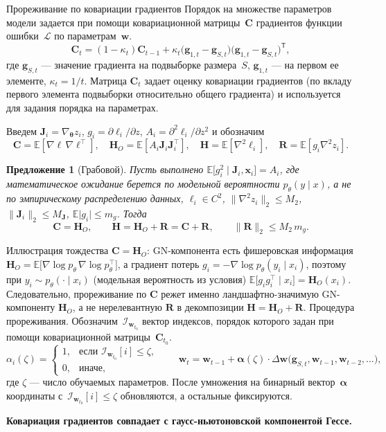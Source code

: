 \documentclass[9pt,pdf,hyperref={unicode}]{beamer}
\newtheorem{rusproposition}{Предложение}
\newcommand{\key}[1]{\par\vspace{0.5ex}\noindent\textbf{\color{darkgreen}#1}}
\begin{document}
\begin{frame}{Прореживание по ковариации градиентов}
\justifying
\footnotesize
Порядок на множестве параметров модели задается при помощи ковариационной матрицы~$\mathbf{C}$ градиентов функции ошибки~$\mathcal{L}$ по параметрам~$\mathbf{w}$.
\[
    \mathbf{C}_t=(1-\kappa_t)\mathbf{C}_{t-1}+\kappa_t\bigl(\mathbf{g}_{1,t}-\mathbf{g}_{S,t}\bigr)\bigl(\mathbf{g}_{1,t}-\mathbf{g}_{S,t}\bigr)^{\mathsf{T}},
\]
где $\mathbf{g}_{S,t}$ --- значение градиента на подвыборке размера~$S$, $\mathbf{g}_{1,t}$ --- на первом ее элементе, $\kappa_t=1/t$. Матрица $\mathbf{C}_t$ задает оценку ковариации градиентов (по вкладу первого элемента подвыборки относительно общего градиента) и используется для задания порядка на параметрах.

Введем $\mathbf{J}_i=\nabla_{\boldsymbol{\theta}}z_i$, $g_i=\partial\ell_i/\partial z$, $A_i=\partial^2\ell_i/\partial z^2$ и обозначим
\[
    \mathbf{C}=\mathbb{E}[\nabla\ell\,\nabla\ell^{\top}],\quad
    \mathbf{H}_O=\mathbb{E}[A_i\mathbf{J}_i\mathbf{J}_i^{\top}],\quad
    \mathbf{H}=\mathbb{E}[\nabla^2\ell_i],\quad
    \mathbf{R}=\mathbb{E}[g_i\nabla^2z_i].
\]
\begin{rusproposition}[Грабовой]
    Пусть выполнено $\mathbb{E}\bigl[g_i^2\mid\mathbf{J}_i,\mathbf{x}_i\bigr]=A_i$, где математическое ожидание берется по модельной вероятности $p_\theta(y\mid x)$, а не по эмпирическому распределению данных, $\ell_i\in C^2$, $\|\nabla^2z_i\|_2\le M_2$, $\|\mathbf{J}_i\|_2\le M_{\mathbf{J}}$, $\mathbb{E}\lvert g_i\rvert\le m_g$. Тогда
    \[
        \mathbf{C}=\mathbf{H}_O,\qquad \mathbf{H}=\mathbf{H}_O+\mathbf{R}=\mathbf{C}+\mathbf{R},\qquad \|\mathbf{R}\|_2\le M_2\,m_g.
    \]
\end{rusproposition}
Иллюстрация тождества $\mathbf{C}=\mathbf{H}_O$: GN-компонента есть фишеровская информация $\mathbf{H}_O=\mathbb{E}\bigl[\nabla\log p_\theta\,\nabla\log p_\theta^{\top}\bigr]$, а градиент потерь $g_i=-\nabla\log p_\theta(y_i\mid x_i)$, поэтому при $y_i\sim p_\theta(\cdot\mid x_i)$ (модельная вероятность из условия) $\mathbb{E}\bigl[g_i g_i^{\top}\mid x_i\bigr]=\mathbf{H}_O(x_i)$. Следовательно, прореживание по $\mathbf{C}$ режет именно ландшафтно-значимую GN-компоненту $\mathbf{H}_O$, а не нерелевантную $\mathbf{R}$ в декомпозиции $\mathbf{H}=\mathbf{H}_O+\mathbf{R}$.
Процедура прореживания. Обозначим~$\mathcal{I}_{\mathbf{w}_{t_0}}$ вектор индексов, порядок которого задан при помощи ковариационной матрицы~$\mathbf{C}_{t_0}$.
\[
    \alpha_i(\zeta)=\begin{cases}
        1,&\text{если }\mathcal{I}_{\mathbf{w}_{t_0}}[i]\le\zeta,\\
        0,&\text{иначе},
    \end{cases}\qquad
    \mathbf{w}_t=\mathbf{w}_{t-1}+\bm{\alpha}(\zeta)\cdot\Delta\mathbf{w}\bigl(\mathbf{g}_{S,t},\mathbf{w}_{t-1},\mathbf{w}_{t-2},\ldots\bigr),
\]
где $\zeta$ --- число обучаемых параметров. После умножения на бинарный вектор~$\bm{\alpha}$ координаты с~$\mathcal{I}_{\mathbf{w}_{t_0}}[i]\le\zeta$ обновляются, а остальные фиксируются.
\key{Ковариация градиентов совпадает с гаусс-ньютоновской компонентой Гессе.}
\end{frame}
\end{document}

